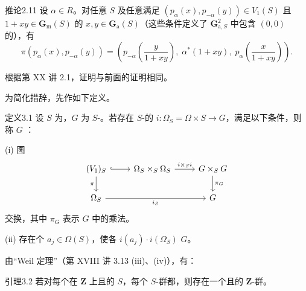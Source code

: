 \begin{SGAresult}{推论}{2.11}
设 $\alpha\in R$。对任意 $S$ 及任意满足 $(p_\alpha(x),p_{-\alpha}(y))\in V_1(S)$ 且 $1+xy\in\mathbf G_{\mathrm m}(S)$ 的 $x,y\in\mathbf G_{\mathrm a}(S)$（这些条件定义了 $\mathbf G_{\mathrm a,S}^2$ 中包含 $(0,0)$ 的），有
\[\pi(p_\alpha(x),p_{-\alpha}(y))=
\left(p_{-\alpha}\left(\frac{y}{1+xy}\right),\;\alpha^*(1+xy),\;p_\alpha\left(\frac{x}{1+xy}\right)\right).\]
\end{SGAresult}
根据第 XX 讲 2.1，证明与前面的证明相同。

为简化措辞，先作如下定义。
\begin{SGAresult}{定义}{3.1}
设 $S$ 为，$G$ 为 $S$-。若存在 $S$-的 $i:\Omega_S=\Omega\times S\to G$，满足以下条件，则称 $G$ ：

(i) 图
\[
\begin{tikzcd}
(V_1)_S\arrow[r,hook]\arrow[d,"\pi"']&\Omega_S\times_S\Omega_S\arrow[r,"i\times_Si"]&G\times_SG\arrow[d,"\pi_G"]\\
\Omega_S\arrow[rr,"i_S"']&&G
\end{tikzcd}
\]
交换，其中 $\pi_G$ 表示 $G$ 中的乘法。

(ii) 存在个 $a_j\in\Omega(S)$，使各 $i(a_j)\cdot i(\Omega_S)$  $G$。
\end{SGAresult}
由“Weil 定理”（第 XVIII 讲 3.13 (iii)、(iv)），有：
\begin{SGAresult}{引理}{3.2}
若对每个在 $\mathbf Z$ 上且的 $S$，每个 $S$-群都，则存在一个且的 $\mathbf Z$-群。
\end{SGAresult}

